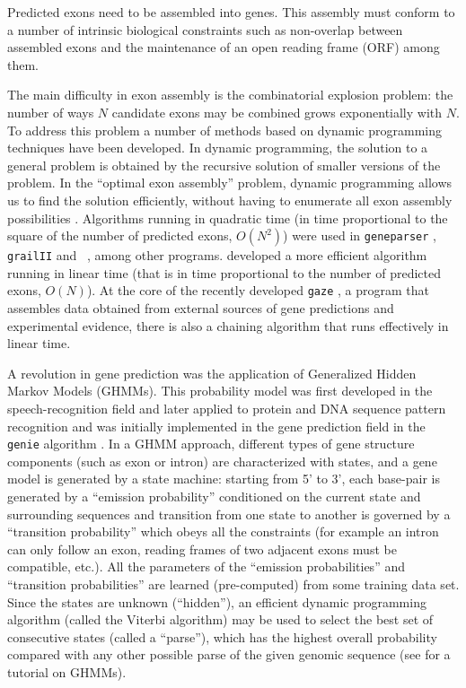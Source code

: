 Predicted exons need to be assembled into genes. This assembly must
conform to a number of intrinsic biological constraints such as
non-overlap between assembled exons and the maintenance of an open
reading frame (ORF) among them.

The main difficulty in exon assembly is the combinatorial explosion
problem: the number of ways $N$ candidate exons may be combined grows
exponentially with $N$. To address this problem a number of methods
based on dynamic programming techniques have been developed. In
dynamic programming, the solution to a general problem is obtained by
the recursive solution of smaller versions of the problem. In the
``optimal exon assembly'' problem, dynamic programming allows us to
find the solution efficiently, without having to enumerate all exon
assembly possibilities \citep{gelfand:1993a}. Algorithms running in
quadratic time (in time proportional to the square of the number of
predicted exons, $O(N^2)$) were used in \texttt{geneparser}
\citep{snyder:1993a}, \texttt{grailII} \citep{xu:1994a} and \fgenes\
\citep{solovyev:1995a}, among other programs. \cite{guigo:1998a}
developed a more efficient algorithm running in linear time (that is
in time proportional to the number of predicted exons, $O(N)$). At the
core of the recently developed \texttt{gaze} \citep{howe:2002a}, a
program that assembles data obtained from external sources of gene
predictions and experimental evidence, there is also a chaining
algorithm that runs effectively in linear time.

A revolution in gene prediction was the application of Generalized
Hidden Markov Models (GHMMs). This probability model was first
developed in the speech-recognition field and later applied to protein
and DNA sequence pattern recognition and was initially implemented in
the gene prediction field in the \texttt{genie} algorithm
\citep{kulp:1996a}.  In a GHMM approach, different types of gene
structure components (such as exon or intron) are characterized with
states, and a gene model is generated by a state machine: starting
from 5' to 3', each base-pair is generated by a ``emission
probability'' conditioned on the current state and surrounding
sequences and transition from one state to another is governed by a
``transition probability'' which obeys all the constraints (for
example an intron can only follow an exon, reading frames of two
adjacent exons must be compatible, etc.). All the parameters of the
``emission probabilities'' and ``transition probabilities'' are
learned (pre-computed) from some training data set. Since the states
are unknown (``hidden''), an efficient dynamic programming algorithm
(called the Viterbi algorithm) may be used to select the best set of
consecutive states (called a ``parse''), which has the highest overall
probability compared with any other possible parse of the given
genomic sequence (see \cite{rabinier:1989a} for a tutorial on GHMMs).


